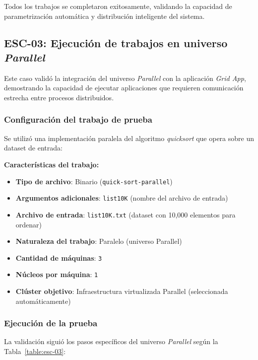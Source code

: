 Todos los trabajos se completaron exitosamente, validando la capacidad de parametrización automática y distribución inteligente del sistema.

\subsection{ESC-03: Ejecución de trabajos en universo \textit{Parallel}}
\noindent

Este caso validó la integración del universo \textit{Parallel} con la aplicación \textit{Grid App}, demostrando la capacidad de ejecutar aplicaciones \MPI que requieren comunicación estrecha entre procesos distribuidos.

\subsubsection{Configuración del trabajo de prueba}
\noindent

Se utilizó una implementación paralela del algoritmo \textit{quicksort} que opera sobre un dataset de entrada:

\textbf{Características del trabajo:}
\begin{itemize}
	\item \textbf{Tipo de archivo}: Binario \MPI (\texttt{quick-sort-parallel})
	\item \textbf{Argumentos adicionales}: \texttt{list10K} (nombre del archivo de entrada)
	\item \textbf{Archivo de entrada}: \texttt{list10K.txt} (dataset con 10,000 elementos para ordenar)
	\item \textbf{Naturaleza del trabajo}: Paralelo (universo Parallel)
	\item \textbf{Cantidad de máquinas}: \texttt{3}
	\item \textbf{Núcleos por máquina}: \texttt{1}
	\item \textbf{Clúster objetivo}: Infraestructura virtualizada Parallel (seleccionada automáticamente)
\end{itemize}

\subsubsection{Ejecución de la prueba}
\noindent

La validación siguió los pasos específicos del universo \textit{Parallel} según la Tabla~\ref{table:esc-03}:

